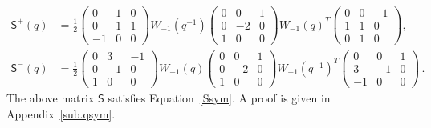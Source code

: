 \documentclass[12pt,reqno]{amsart}
\theoremstyle{definition}
\def\ms{\mathsf}
\begin{document}
\begin{subequations}
\begin{align}
  \label{S52p}
  \mathsf{S}^+(q) &= \frac{1}{2}
      \begin{pmatrix}
        0&1&0\\
        0&1&1\\
        -1&0&0
      \end{pmatrix} W_{-1}(q^{-1})
               \begin{pmatrix}
                 0&0&1\\
                 0&-2&0\\
                 1&0&0
               \end{pmatrix} W_{-1}(q)^T
               \begin{pmatrix}
                 0&0&-1\\
                 1&1&0\\
                 0&1&0
               \end{pmatrix},\\
  \label{S52m}
  \mathsf{S}^-(q) &= \frac{1}{2}
      \begin{pmatrix}
        0&3&-1\\
        0&-1&0\\
        1&0&0
      \end{pmatrix}
              W_{-1}(q)
              \begin{pmatrix}
                 0&0&1\\
                 0&-2&0\\
                 1&0&0
               \end{pmatrix} W_{-1}(q^{-1})^T
              \begin{pmatrix}
                0&0&1\\
                3&-1&0\\
                -1&0&0
              \end{pmatrix}\,.
\end{align}
\end{subequations}
The above matrix $\ms{S}$ satisfies Equation~\eqref{Ssym}. A proof is
given in Appendix~\ref{sub.qsym}.

\end{document}
